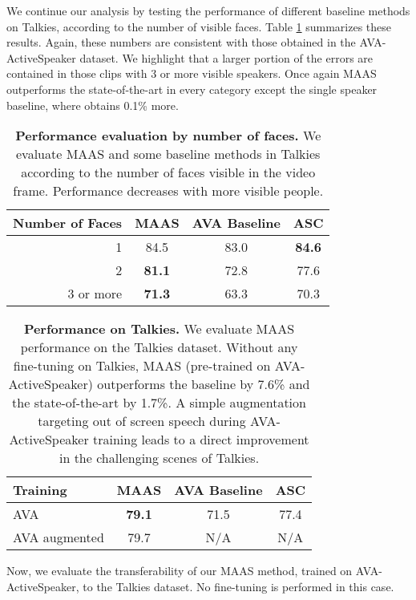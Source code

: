 \documentclass[10pt,twocolumn,letterpaper]{article}
\begin{document}
We continue our analysis by testing the performance of different baseline methods on Talkies, according to the number of visible faces. Table \ref{tab:talkies_scenarios} summarizes these results. Again, these numbers are consistent with those obtained in the AVA-ActiveSpeaker dataset. We highlight that a larger portion of the errors are contained in those clips with 3 or more visible speakers. Once again MAAS outperforms the state-of-the-art in every category except the single speaker baseline, where \cite{alcazar2020active} obtains 0.1\% more. 

\begin{table}[t]
    \small
    \centering
    \begin{tabular}{r c c c }
        \hline
        \textbf{Number of Faces}  & \textbf{MAAS}  & \textbf{AVA Baseline} \cite{roth2019ava} & \textbf{ASC} \cite{alcazar2020active} \\
        \hline 
        1 & 84.5 & 83.0 & \textbf{84.6} \\
        2 & \textbf{81.1} & 72.8 & 77.6 \\
        3 or more & \textbf{71.3} & 63.3 & 70.3\\
        \hline
    \end{tabular}
    
    \caption{\textbf{Performance evaluation by number of faces.} 
    We evaluate MAAS and some baseline methods in Talkies according to the number of  faces visible in the video frame. Performance decreases with more visible people.
    }
    \label{tab:talkies_scenarios}
\end{table}

\begin{table}[h]
    \small
    \centering
    \begin{tabular}{l c c c }
        \hline
        \textbf{Training}  & \textbf{MAAS}  & \textbf{AVA Baseline} \cite{roth2019ava} & \textbf{ASC} \cite{alcazar2020active} \\
        \hline 
        AVA & \textbf{79.1} & 71.5 & 77.4 \\
        AVA augmented & 79.7 & N/A & N/A \\
        \hline
    \end{tabular}
    
    \caption{\textbf{Performance on Talkies.} 
    We evaluate MAAS  performance on the Talkies dataset. Without any fine-tuning on Talkies, MAAS (pre-trained on AVA-ActiveSpeaker) outperforms the baseline by 7.6\% and the state-of-the-art by 1.7\%. A simple augmentation targeting out of screen speech during AVA-ActiveSpeaker training leads to a direct improvement in the challenging scenes of Talkies.
    }
    \label{tab:talkies}
\end{table} 
Now, we evaluate the transferability of our MAAS method, trained on AVA-ActiveSpeaker, to the Talkies dataset. No fine-tuning is performed in this case. 
\end{document}
